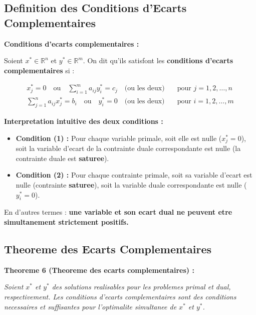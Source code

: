 \documentclass[12pt,a4paper]{article}
\begin{document}
\subsection{Definition des Conditions d'Ecarts Complementaires}

\begin{definition}
\textbf{Conditions d'ecarts complementaires :}

Soient $x^* \in \mathbb{R}^n$ et $y^* \in \mathbb{R}^m$. On dit qu'ils satisfont les \textcolor{defvert}{\textbf{conditions d'ecarts complementaires}} si :

\begin{align}
x_j^* = 0 \quad \text{ou} \quad \sum_{i=1}^{m} a_{ij} y_i^* = c_j \quad \text{(ou les deux)} &\quad \text{pour } j = 1, 2, \ldots, n \tag{1}\\[6pt]
\sum_{j=1}^{n} a_{ij} x_j^* = b_i \quad \text{ou} \quad y_i^* = 0 \quad \text{(ou les deux)} &\quad \text{pour } i = 1, 2, \ldots, m \tag{2}
\end{align}
\end{definition}

\begin{notecours}
\textbf{Interpretation intuitive des deux conditions :}

\begin{itemize}
    \item \textcolor{titrebleu}{\textbf{Condition (1) :}} Pour chaque variable primale, soit elle est nulle ($x_j^* = 0$), soit la variable d'ecart de la contrainte duale correspondante est nulle (la contrainte duale est \textbf{saturee}).
    \item \textcolor{defvert}{\textbf{Condition (2) :}} Pour chaque contrainte primale, soit sa variable d'ecart est nulle (contrainte \textbf{saturee}), soit la variable duale correspondante est nulle ($y_i^* = 0$).
\end{itemize}

En d'autres termes : \textcolor{importantrouge}{\textbf{une variable et son ecart dual ne peuvent etre simultanement strictement positifs.}}
\end{notecours}

\newpage
\subsection{Theoreme des Ecarts Complementaires}

\begin{theoreme}
\textbf{Theoreme 6 (Theoreme des ecarts complementaires) :}

\textit{Soient $x^*$ et $y^*$ des solutions realisables pour les problemes primal et dual, respectivement. Les conditions d'ecarts complementaires sont des conditions \textcolor{defvert}{necessaires et suffisantes} pour l'optimalite simultanee de $x^*$ et $y^*$.}
\end{theoreme}
\end{document}
